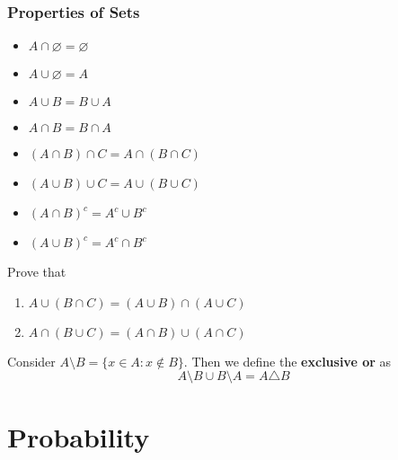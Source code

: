 \documentclass{article}
\begin{document}
\subsubsection{Properties of Sets}
	\begin{multicols}{2}
		\begin{itemize}
			\item $A \cap \varnothing = \varnothing$
			\item $A \cup \varnothing = A$
			\item $A \cup B = B \cup A$
			\item $A \cap B = B \cap A$
			\item $(A\cap B)\cap C = A \cap (B \cap C)$
			\item $(A \cup B) \cup C = A \cup (B \cup C)$
			\item $(A \cap B)^c = A^c \cup B^c$
			\item $(A \cup B)^c = A^c \cap B^c$
		\end{itemize}
	\end{multicols}
	\begin{exe}
		Prove that
		\begin{enumerate}
			\item $A \cup (B \cap C) = (A \cup B) \cap (A \cup C)$
			\item $A \cap (B \cup C) = (A \cap B) \cup (A \cap C)$
		\end{enumerate}
	\end{exe}
	\begin{note}
		Consider $A \setminus B = \{ x\in A: x \notin B \}$. Then we define the \textbf{exclusive or} as
		$$ A \setminus B \cup B \setminus A = A \triangle B$$
	\end{note}
\pagebreak
\section{Probability}
\end{document}
